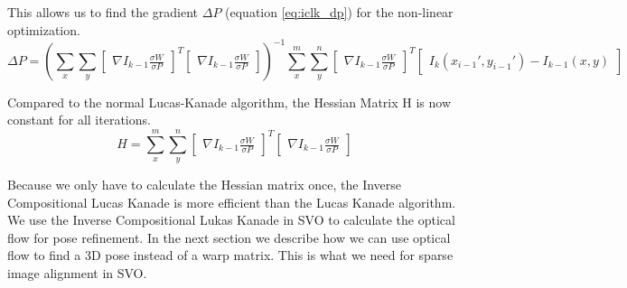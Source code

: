\documentclass[11pt,a4paper,titlepage,oneside]{report}
\begin{document}
This allows us to find the gradient $\Delta P$ (equation \ref{eq:iclk_dp}) for the non-linear optimization.
\tiny
\begin{equation}\label{eq:iclk_dp}
  \Delta P=(\sum_x\sum_y\begin{bmatrix}\nabla I_{k-1}\frac{\sigma W}{\sigma P}\end{bmatrix}^T\begin{bmatrix}\nabla I_{k-1}\frac{\sigma W}{\sigma P}\end{bmatrix})^{-1}
  \sum_x^m\sum_y^n\begin{bmatrix}\nabla I_{k-1}\frac{\sigma W}{\sigma P}\end{bmatrix}^T\begin{bmatrix}I_{k}(x_{i-1}',y_{i-1}') - I_{k-1}(x,y)\end{bmatrix}
\end{equation}
\normalsize

Compared to the normal Lucas-Kanade algorithm, the Hessian Matrix H is now constant for all iterations.
\begin{equation}
  H=\sum_x^m\sum_y^n\begin{bmatrix}\nabla I_{k-1}\frac{\sigma W}{\sigma P}\end{bmatrix}^T\begin{bmatrix}\nabla I_{k-1}\frac{\sigma W}{\sigma P}\end{bmatrix}
\end{equation}

Because we only have to calculate the Hessian matrix once, the Inverse Compositional Lucas Kanade is more efficient than the Lucas Kanade algorithm.\\
We use the Inverse Compositional Lukas Kanade in SVO to calculate the optical flow for pose refinement. In the next section we describe how we can use optical flow to find a 3D pose instead of a warp matrix. This is what we need for sparse image alignment in SVO.
\end{document}
